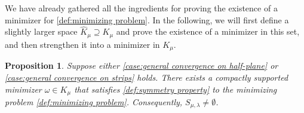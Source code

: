 \documentclass[11pt,letterpaper]{amsart}
\newtheorem{prop}[thm]{Proposition}
\theoremstyle{definition}
\theoremstyle{remark}
\renewcommand{\S}{\mathcal{S}}
\renewcommand{\O}{\Omega}
\numberwithin{equation}{section}
\begin{document}
We have already gathered all the ingredients for proving the existence of a minimizer for \eqref{def:minimizing problem}. In the following, we will first define a slightly larger space $\widehat{K}_{\mu}\supseteq K_{\mu}$ and prove the existence of a minimizer in this set, and then strengthen it into a minimizer in $K_{\mu}$.

\begin{prop}\label{prop:strip exists of minimizer}
    Suppose either \ref{case:general convergence on half-plane} or \ref{case:general convergence on strips} holds.
    There exists a compactly supported minimizer $\omega\in K_{\mu}$ that satisfies \eqref{def:symmetry property} to the minimizing problem \eqref{def:minimizing problem}. Consequently, $S_{\mu,\lambda}\neq \emptyset$.
\end{prop}
\end{document}
